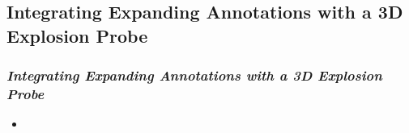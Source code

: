 \subsection{Integrating Expanding Annotations with a 3D Explosion Probe}
\begin{frame}\frametitle{\emph{Integrating Expanding Annotations with a 3D Explosion Probe} \cite{23}} 
\begin{itemize}
	\item 
\end{itemize}	
\end{frame}